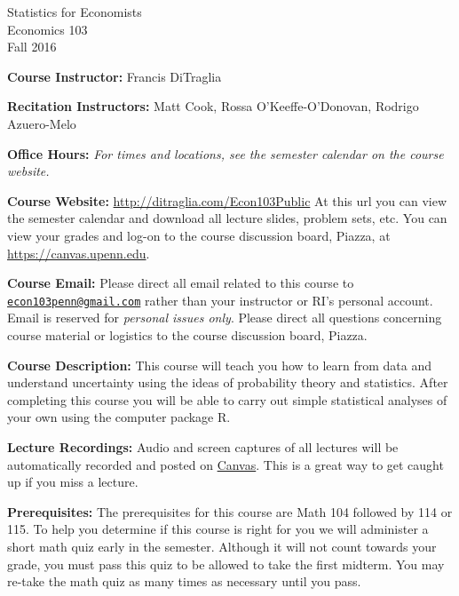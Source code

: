 \documentclass[11pt, letterpaper]{article}
\begin{document}
\thispagestyle{plain}

\begin{center}
\Large
\sc
Statistics for Economists\\
\large
Economics 103\\
\large
Fall 2016
\end{center}


\normalsize
\bigskip
\noindent \textbf{Course Instructor:} Francis DiTraglia 

\medskip


\noindent \textbf{Recitation Instructors:}
  Matt Cook,  
  Rossa O'Keeffe-O'Donovan,
  Rodrigo Azuero-Melo
\medskip


\noindent \textbf{Office Hours:} \emph{For times and locations, see the semester calendar on the course website.}


\medskip
 
\noindent \textbf{Course Website:} \url{http://ditraglia.com/Econ103Public} At this url you can view the semester calendar and download all lecture slides, problem sets, etc.
You can view your grades and log-on to the course discussion board, Piazza, at \url{https://canvas.upenn.edu}.

\medskip

\noindent \textbf{Course Email:} Please direct all email related to this course to \href{mailto:econ103penn@gmail.com}{\texttt{econ103penn@gmail.com}} rather than your instructor or RI's personal account.
Email is reserved for \emph{personal issues only}. 
Please direct all questions concerning course material or logistics to the course discussion board, Piazza.

\medskip



\noindent \textbf{Course Description:} 
This course will teach you how to learn from data and understand uncertainty using the ideas of probability theory and statistics. 
After completing this course you will be able to carry out simple statistical analyses of your own using the computer package R.


\medskip

\noindent \textbf{Lecture Recordings: } 
Audio and screen captures of all lectures will be automatically recorded and posted on \href{http://upenn.instructure.com}{Canvas}. 
This is a great way to get caught up if you miss a lecture.
\medskip

\noindent \textbf{Prerequisites:} 
The prerequisites for this course are Math 104 followed by 114 or 115. 
To help you determine if this course is right for you we will administer a short math quiz early in the semester.
Although it will not count towards your grade, you must pass this quiz to be allowed to take the first midterm.
You may re-take the math quiz as many times as necessary until you pass.
\end{document}
